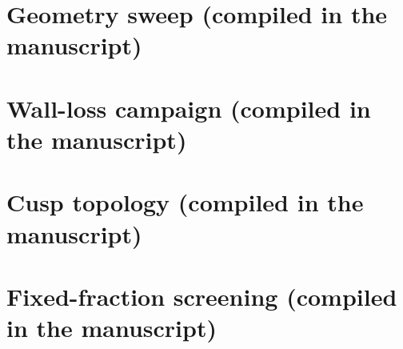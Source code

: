 \documentclass[11pt]{article}
\begin{document}
\section{Geometry sweep (compiled in the manuscript)}\label{sec:l1a-sweep-v2}
\section{Wall-loss campaign (compiled in the manuscript)}\label{sec:wall-loss-v4}
\section{Cusp topology (compiled in the manuscript)}\label{sec:cusp-topology}
\section{Fixed-fraction screening (compiled in the manuscript)}\label{sec:wall-loss-geometry-screening}

\end{document}
